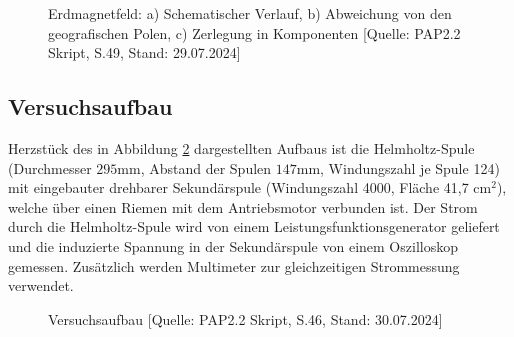\documentclass{article}
\begin{document}
\begin{figure}[!h]
    \centering
    \caption{Erdmagnetfeld: a) Schematischer Verlauf, b) Abweichung von den geografischen Polen, c) Zerlegung in Komponenten [Quelle: PAP2.2 Skript, S.49, Stand: 29.07.2024]}
    \label{fig:Erdmagnetfeld}
\end{figure}

\newpage
\subsection{Versuchsaufbau}

Herzstück des in Abbildung \ref{fig:Aufbau} dargestellten Aufbaus ist die Helmholtz-Spule (Durchmesser $295$mm, Abstand der Spulen $147$mm, Windungszahl je Spule 124) mit eingebauter drehbarer Sekundärspule (Windungszahl 4000, Fläche 41,7 cm$^2$), welche über einen Riemen mit dem Antriebsmotor verbunden ist. Der Strom durch die Helmholtz-Spule wird von einem Leistungsfunktionsgenerator geliefert und die induzierte Spannung in der Sekundärspule von einem Oszilloskop gemessen. Zusätzlich werden Multimeter zur gleichzeitigen Strommessung verwendet.  

\begin{figure}[!b]
    \centering
    \caption{Versuchsaufbau [Quelle: PAP2.2 Skript, S.46, Stand: 30.07.2024]}
    \label{fig:Aufbau}
\end{figure}
\end{document}
